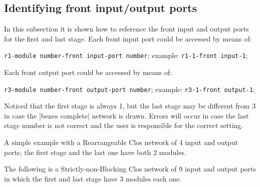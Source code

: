 \documentclass{ltxdoc}
\begin{document}
\subsection{Identifying front input/output ports}
In this subsection it is shown how to reference the front input and output ports for the first and last stage. Each front input port could be accessed by means of:
\begin{flushleft}
\verb|r1-|\bgroup\color{red!75!black}\verb|module number|\egroup\verb|-|\bgroup\color{red!75!black}\verb|front input|\egroup\verb|-|\bgroup\color{red!75!black}\verb|port number|\egroup; example: \verb|r1-1-front input-1|;
\end{flushleft}
Each front output port could be accessed by means of:
\begin{flushleft}
\verb|r3-|\bgroup\color{red!75!black}\verb|module number|\egroup\verb|-|\bgroup\color{red!75!black}\verb|front output|\egroup\verb|-|\bgroup\color{red!75!black}\verb|port number|\egroup; example: \verb|r3-1-front output-1|;
\end{flushleft}
Noticed that the first stage is always 1, but the last stage may be different from 3 in case the |benes complete| network is drawn. Errors will occur in case the last stage number is not correct and the user is responsible for the correct setting.

A simple example with a Rearrangeable Clos network of 4 input and output ports; the first stage and the last one have both 2 modules.

\begin{codeexample}[]
\end{codeexample}

The following is a Strictly-non-Blocking Clos network of 9 input and output ports in which the first and last stage have 3 modules each one.

\begin{codeexample}[]
\end{codeexample}
\end{document}
